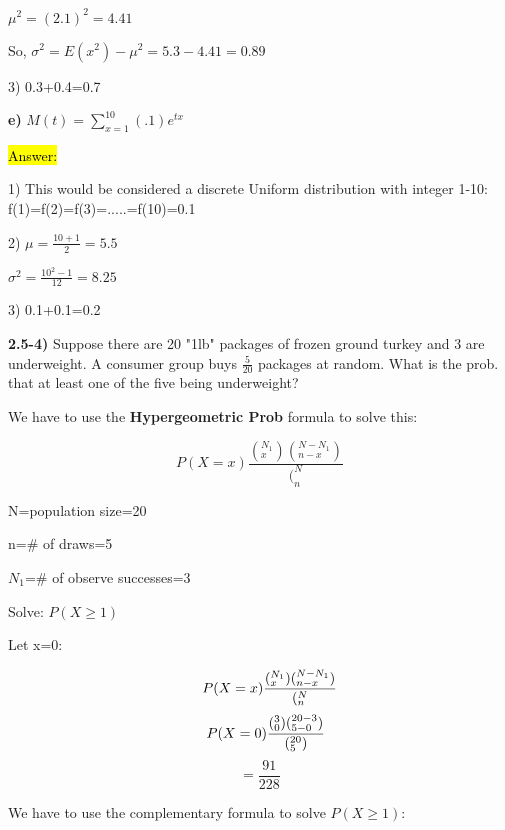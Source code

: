 \documentclass{article}
\begin{document}
$\mu^{2}=(2.1)^{2}=4.41$


\vspace{2mm}

So, $\sigma^{2}=E(x^{2})-\mu^{2}=5.3-4.41=0.89$

\vspace{2mm}

3) 0.3+0.4=0.7

\vspace{5mm}

\textbf{e)} $M(t)=\sum^{10}_{x=1}(.1)e^{tx}$

\vspace{2mm}

\hl{Answer:}

\vspace{2mm}

1) This would be considered a discrete Uniform distribution with integer 1-10: f(1)=f(2)=f(3)=.....=f(10)=0.1

\vspace{2mm}

2) $\mu=\frac{10+1}{2}=5.5$

$\sigma^{2}=\frac{10^{2}-1}{12}=8.25$

\vspace{2mm}

3) 0.1+0.1=0.2




\newpage
\textbf{2.5-4)} Suppose there are 20 "1lb" packages of frozen ground turkey and 3 are underweight. A consumer group buys $\frac{5}{20}$ packages at random. What is the prob. that at least one of the five being underweight?

We have to use the \textbf{Hypergeometric Prob} formula to solve this:

$$P(X=x)\frac{(^{N_{1}} _{x})(^{N-N_{1}} _{n-x})}{(^{N}_{n}}$$

N=population size=20

n=\# of draws=5

$N_{1}$=\# of observe successes=3

Solve: $P(X \ge 1)$

Let x=0:

$$\hspace{5mm}P(X=x)\frac{(^{N_{1}} _{x})(^{N-N_{1}} _{n-x})}{(^{N}_{n}}$$
$$\hspace{3mm}P(X=0)\frac{(^{3}_{0})(^{20-3}_{5-0})}{(^{20}_{5})}$$
$$=\frac{91}{228}$$

We have to use the complementary formula to solve $P(X \ge 1)$:
\end{document}
